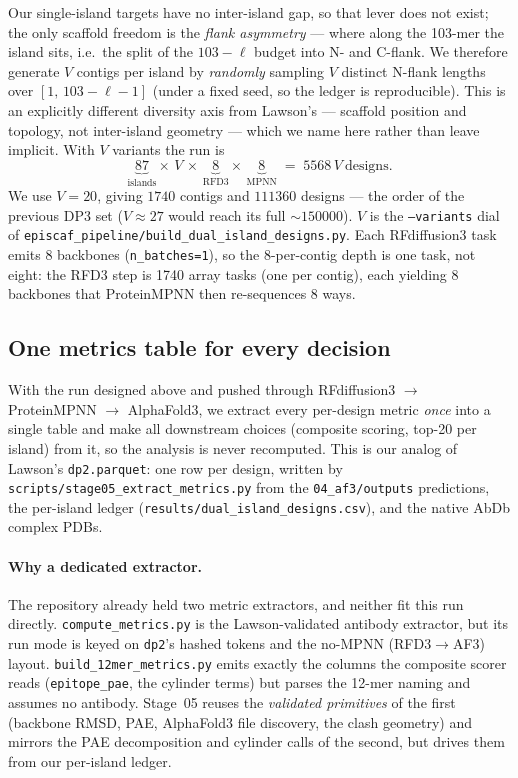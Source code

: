 Our single-island targets have no inter-island gap, so that lever does not exist; the only
scaffold freedom is the \emph{flank asymmetry} --- where along the \num{103}-mer the island
sits, i.e.\ the split of the $103-\ell$ budget into N- and C-flank. We therefore generate $V$
contigs per island by \emph{randomly} sampling $V$ distinct N-flank lengths over
$[1,\,103-\ell-1]$ (under a fixed seed, so the ledger is reproducible). This is an explicitly
different diversity axis from Lawson's --- scaffold position and topology, not inter-island
geometry --- which we name here rather than leave implicit. With $V$ variants the run is
\begin{equation}\label{eq:runsize}
\underbrace{\num{87}}_{\text{islands}}\times\,V\,\times\,\underbrace{\num{8}}_{\text{RFD3}}\times\,\underbrace{\num{8}}_{\text{MPNN}}
\;=\;\num{5568}\,V \ \text{designs}.
\end{equation}
We use $V=\num{20}$, giving $\num{1740}$ contigs and $\num{111360}$ designs --- the order of
the previous DP3 set ($V\approx\num{27}$ would reach its full $\sim\!\num{150000}$). $V$ is the
\texttt{--variants} dial of \texttt{episcaf\_pipeline/build\_dual\_island\_designs.py}. Each
RFdiffusion3 task emits \num{8} backbones (\texttt{n\_batches=1}), so the \num{8}-per-contig
depth is one task, not eight: the RFD3 step is \num{1740} array tasks (one per contig), each
yielding \num{8} backbones that ProteinMPNN then re-sequences \num{8} ways.



\subsection{One metrics table for every decision}\label{sec:metrics}
With the run designed above and pushed through RFdiffusion3 $\rightarrow$ ProteinMPNN
$\rightarrow$ AlphaFold3, we extract every per-design metric \emph{once} into a single table
and make all downstream choices (composite scoring, top-\num{20} per island) from it, so the analysis
is never recomputed. This is our analog of Lawson's \texttt{dp2.parquet}: one row per design,
written by \texttt{scripts/stage05\_extract\_metrics.py} from the \texttt{04\_af3/outputs}
predictions, the per-island ledger (\texttt{results/dual\_island\_designs.csv}), and the native
AbDb complex PDBs.

\paragraph{Why a dedicated extractor.}
The repository already held two metric extractors, and neither fit this run directly.
\texttt{compute\_metrics.py} is the Lawson-validated antibody extractor, but its run mode is
keyed on \texttt{dp2}'s hashed tokens and the no-MPNN (RFD3$\rightarrow$AF3) layout.
\texttt{build\_12mer\_metrics.py} emits exactly the columns the composite scorer reads
(\texttt{epitope\_pae}, the cylinder terms) but parses the 12-mer naming and assumes no
antibody. Stage~05 reuses the \emph{validated primitives} of the first (backbone RMSD,
PAE, AlphaFold3 file discovery, the clash geometry) and mirrors the PAE decomposition and
cylinder calls of the second, but drives them from our per-island ledger.

